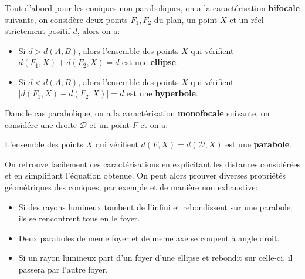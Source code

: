 \subsection*{}
Tout d'abord pour les coniques non-paraboliques, on a la caractérisation \textbf{bifocale} suivante, on considère deux points \(F_1, F_2\) du plan, un point \(X\) et un réel strictement positif \(d\), alors on a:
\begin{itemize}
   \item Si \(d > d(A, B)\), alors l'ensemble des points \(X\) qui vérifient \(d(F_1, X) + d(F_2, X) = d\) est une \textbf{ellipse}.
   \item Si \(d < d(A, B)\), alors l'ensemble des points \(X\) qui vérifient \(|d(F_1, X) - d(F_2, X)| = d\) est une \textbf{hyperbole}.
\end{itemize}

Dans le cas parabolique, on a la caractérisation \textbf{monofocale} suivante, on considére une droite \(\mathcal{D}\) et un point \(F\) et on a:
\begin{center}
   L'ensemble des points \(X\) qui vérifient \(d(F, X) = d(\mathcal{D}, X)\) est une \textbf{parabole}.
\end{center}
On retrouve facilement ces caractérisations en explicitant les distances considérées et en simplifiant l'équation obtenue. On peut alors prouver diverses propriétés géométriques des coniques, par exemple et de manière non exhaustive:
\begin{itemize}
   \item Si des rayons lumineux tombent de l'infini et rebondissent sur une parabole, ils se rencontrent tous en le foyer.
   \item Deux paraboles de meme foyer et de meme axe se coupent à angle droit.
   \item Si un rayon lumineux part d'un foyer d'une ellipse et rebondit sur celle-ci, il passera par l'autre foyer.
\end{itemize}

\subsection*{}

\chapter*{} %
